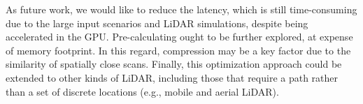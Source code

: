 As future work, we would like to reduce the latency, which is still time-consuming due to the large input scenarios and LiDAR simulations, despite being accelerated in the GPU. Pre-calculating ought to be further explored, at expense of memory footprint. In this regard, compression may be a key factor due to the similarity of spatially close scans. Finally, this optimization approach could be extended to other kinds of LiDAR, including those that require a path rather than a set of discrete locations (e.g., mobile and aerial LiDAR). 
